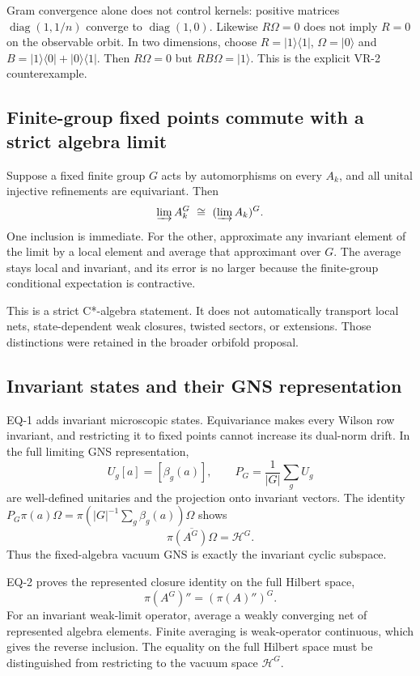 Gram convergence alone does not control kernels: positive matrices
$\operatorname{diag}(1,1/n)$ converge to $\operatorname{diag}(1,0)$.
Likewise $R\Omega=0$ does not imply $R=0$ on the observable orbit.
In two dimensions, choose $R=|1\rangle\langle1|$, $\Omega=|0\rangle$
and $B=|1\rangle\langle0|+|0\rangle\langle1|$. Then $R\Omega=0$ but
$RB\Omega=|1\rangle$. This is the explicit VR-2 counterexample.


\subsection{Finite-group fixed points commute with a strict algebra limit}

Suppose a fixed finite group $G$ acts by automorphisms on every $A_k$,
and all unital injective refinements are equivariant. Then
\[
 \varinjlim A_k^G\ \cong\ (\varinjlim A_k)^G.
\]
One inclusion is immediate. For the other, approximate any invariant element
of the limit by a local element and average that approximant over $G$.
The average stays local and invariant, and its error is no larger because
the finite-group conditional expectation is contractive.

This is a strict C*-algebra statement. It does not automatically transport
local nets, state-dependent weak closures, twisted sectors, or extensions.
Those distinctions were retained in the broader orbifold proposal.

\subsection{Invariant states and their GNS representation}

EQ-1 adds invariant microscopic states. Equivariance makes every Wilson row
invariant, and restricting it to fixed points cannot increase its dual-norm
drift. In the full limiting GNS representation,
\[
 U_g[a]=[\beta_g(a)],\qquad
 P_G=\frac1{|G|}\sum_gU_g
\]
are well-defined unitaries and the projection onto invariant vectors.
The identity
$P_G\pi(a)\Omega=\pi(|G|^{-1}\sum_g\beta_g(a))\Omega$ shows
\[
 \overline{\pi(A^G)\Omega}=\mathcal H^G.
\]
Thus the fixed-algebra vacuum GNS is exactly the invariant cyclic subspace.

EQ-2 proves the represented closure identity on the full Hilbert space,
\[
 \pi(A^G)''=(\pi(A)'')^G.
\]
For an invariant weak-limit operator, average a weakly converging net of
represented algebra elements. Finite averaging is weak-operator continuous,
which gives the reverse inclusion. The equality on the full Hilbert space
must be distinguished from restricting to the vacuum space $\mathcal H^G$.

